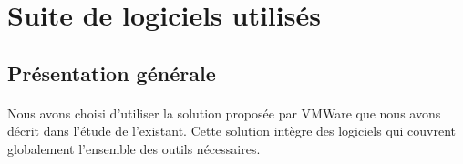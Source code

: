 \section{Suite de logiciels utilisés}

\subsection{Présentation générale}

\paragraph{} Nous avons choisi d'utiliser la solution proposée par VMWare que
nous avons décrit dans l'étude de l'existant. Cette solution intègre des
logiciels qui couvrent globalement l'ensemble des outils nécessaires.
